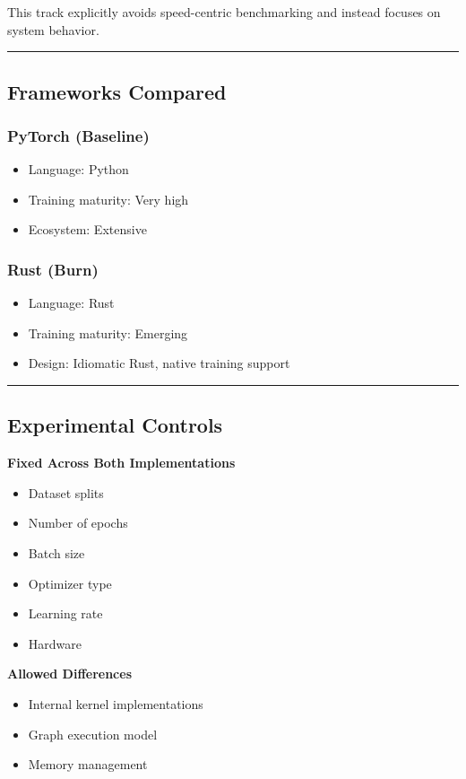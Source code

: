 \documentclass{ieeeaccess}
\begin{document}
This track explicitly avoids speed-centric benchmarking and instead focuses on system behavior.

\hrule

\subsection{Frameworks Compared} 

\subsubsection{PyTorch (Baseline)}
\begin{itemize}
    \item Language: Python
    \item Training maturity: Very high
    \item Ecosystem: Extensive
\end{itemize}

\subsubsection{Rust (Burn)}
\begin{itemize}
    \item Language: Rust
    \item Training maturity: Emerging
    \item Design: Idiomatic Rust, native training support
\end{itemize}

\hrule

\subsection{Experimental Controls}

\textbf{Fixed Across Both Implementations}
\begin{itemize}
    \item Dataset splits
    \item Number of epochs
    \item Batch size
    \item Optimizer type
    \item Learning rate
    \item Hardware
\end{itemize}

\textbf{Allowed Differences}
\begin{itemize}
    \item Internal kernel implementations
    \item Graph execution model
    \item Memory management
\end{itemize}
\end{document}
